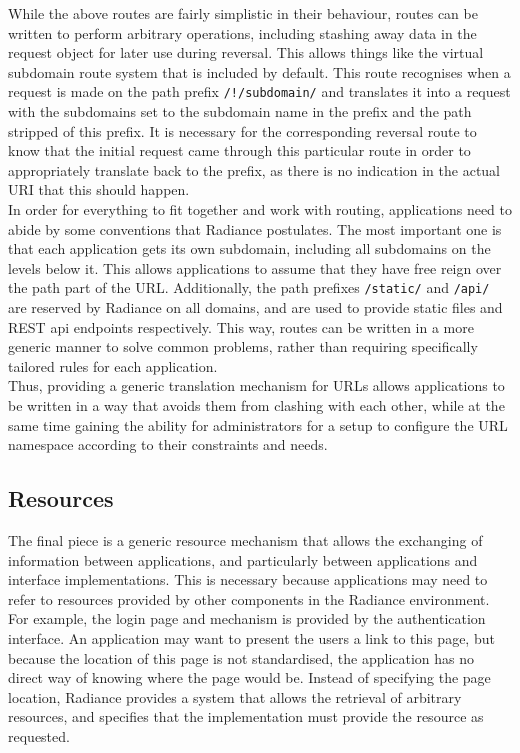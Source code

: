 \documentclass{sig-alternate}
\begin{document}
While the above routes are fairly simplistic in their behaviour, routes can be written to perform arbitrary operations, including stashing away data in the request object for later use during reversal. This allows things like the virtual subdomain route system that is included by default. This route recognises when a request is made on the path prefix \texttt{/!/subdomain/} and translates it into a request with the subdomains set to the subdomain name in the prefix and the path stripped of this prefix. It is necessary for the corresponding reversal route to know that the initial request came through this particular route in order to appropriately translate back to the prefix, as there is no indication in the actual URI that this should happen. \\

In order for everything to fit together and work with routing, applications need to abide by some conventions that Radiance postulates. The most important one is that each application gets its own subdomain, including all subdomains on the levels below it. This allows applications to assume that they have free reign over the path part of the URL. Additionally, the path prefixes \texttt{/static/} and \texttt{/api/} are reserved by Radiance on all domains, and are used to provide static files and REST api endpoints respectively. This way, routes can be written in a more generic manner to solve common problems, rather than requiring specifically tailored rules for each application. \\

Thus, providing a generic translation mechanism for URLs allows applications to be written in a way that avoids them from clashing with each other, while at the same time gaining the ability for administrators for a setup to configure the URL namespace according to their constraints and needs. \\

\subsection{Resources}
The final piece is a generic resource mechanism that allows the exchanging of information between applications, and particularly between applications and interface implementations. This is necessary because applications may need to refer to resources provided by other components in the Radiance environment. For example, the login page and mechanism is provided by the authentication interface. An application may want to present the users a link to this page, but because the location of this page is not standardised, the application has no direct way of knowing where the page would be. Instead of specifying the page location, Radiance provides a system that allows the retrieval of arbitrary resources, and specifies that the implementation must provide the resource as requested. \\
\end{document}
